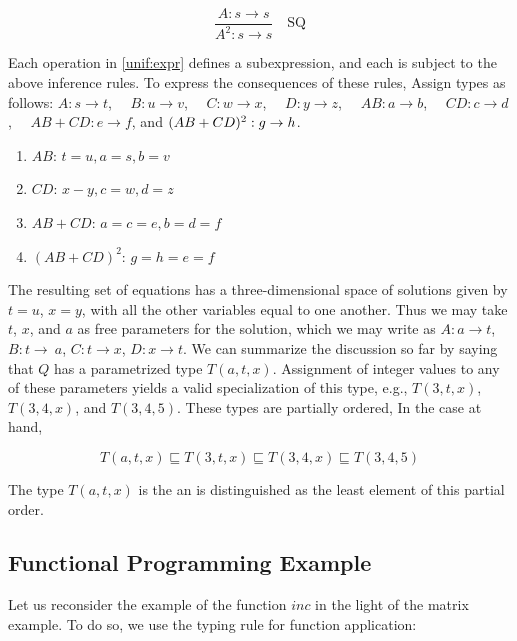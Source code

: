 \begin{equation}
\frac{A : s \to s}{A^2 : s \to s}\quad \text{SQ}
\end{equation}

Each operation in \eqref{unif:expr} defines a subexpression, and each is subject to the above inference rules. To express the consequences of these rules,  Assign types as follows: $A : s \to t$, $\quad B : u \to v$, $\quad C : w \to x$, $\quad D : y \to z$, $\quad AB: a \to b$, $\quad CD: c \to d$, $\quad AB + CD : e \to f$, and $\space(AB + CD)^2 : g \to h$.

\begin{enumerate}

\item $AB$: $ t = u, a = s, b = v$

\item $CD$: $x - y, c = w, d = z$

\item $AB + CD$: $a = c = e, b = d = f$

\item $(AB + CD)^2$: $g = h = e = f$

\end{enumerate}

The resulting set of equations has a three-dimensional space of solutions given by $t = u$, $x = y$, with all the other variables equal to one another.  Thus we may take $t$, $x$, and $a$ as free parameters for the solution, which we may write as $A: a \to t$, $B : t \to\
 a$, $C: t \to x$, $D: x \to t$. We can summarize the discussion so far by saying that $Q$ has a parametrized type $T(a,t,x)$.  Assignment of integer values to any of these parameters yields a valid specialization of this type, e.g., $T(3,t,x)$, $T(3,4,x)$, and $T(3,4,5)$. These types are partially ordered,  In the case at hand, 

\begin{equation}
T(a,t,x) \sqsubseteq T(3,t,x)  \sqsubseteq T(3,4,x)  \sqsubseteq T(3,4,5) 
\end{equation}

The type $T(a,t,x)$ is the  an is distinguished as the least element of this partial order.

\subsection{Functional Programming Example}

Let us reconsider the example of the function $inc$ in the light of the matrix example.  To do so, we use the typing rule for function application:

